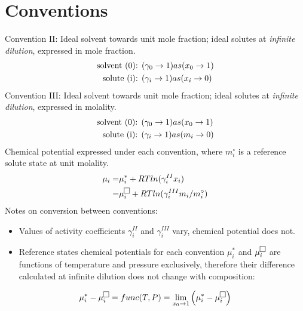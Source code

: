 \documentclass[twocolumn]{article}
\begin{document}
\section{Conventions} %
\label{sec:section_name}
Convention II: Ideal solvent towards unit mole fraction; ideal solutes at \textit{infinite dilution}, expressed in mole fraction. \cite{Denbigh1968} \\
\begin{equation}
\begin{aligned}
\textnormal{solvent (0): } & (\gamma_0 \rightarrow 1) as  (x_0 \rightarrow 1)\\
\textnormal{solute (i): } & (\gamma_i \rightarrow 1) as (x_i \rightarrow 0)
\end{aligned}
\end{equation}
Convention III: Ideal solvent towards unit mole fraction; ideal solutes at \textit{infinite dilution}, expressed in molality. \\
\begin{equation}
\begin{aligned}
\textnormal{solvent (0): } & (\gamma_0 \rightarrow 1) as  (x_0 \rightarrow 1)\\
\textnormal{solute (i): } & (\gamma_i \rightarrow 1) as (m_i \rightarrow 0)
\end{aligned}
\end{equation}
Chemical potential expressed under each convention, where $m_i^{\circ}$ is a reference solute state at unit molality.
\begin{equation}
\begin{aligned}
\mu_i = & \mu_i^{*} + RTln(\gamma_i^{II} x_i) \\
	=	& \mu_i^{\fbox{}} + RTln(\gamma_i^{III} m_i/m_i^{\circ})
\end{aligned}
\end{equation}
Notes on conversion between conventions: 
\begin{itemize}
\item Values of activity coefficients $\gamma_i^{II}$ and $\gamma_i^{III}$ vary, chemical potential does not.
\item Reference states chemical potentials for each convention $\mu_i^{*}$ and $\mu_i^{\fbox{}}$  are functions of temperature and pressure exclusively, therefore their difference calculated at infinite dilution does not change with composition:
\end{itemize}
\[
\mu_i^{*} - \mu_i^{\fbox{}}  =  func(T,P) =  \lim_{x_0 \to 1} \left( \mu_i^{*} - \mu_i^{\fbox{}}\right) 
\]
\end{document}
